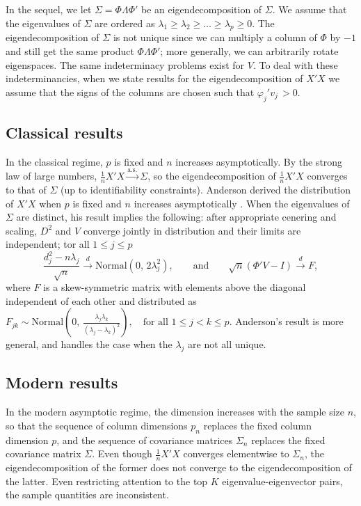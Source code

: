 \documentclass{eoeauth}
\begin{document}
In the sequel, we let $\Sigma = \Phi \Lambda \Phi'$ be an
eigendecomposition of $\Sigma$.  We assume that the eigenvalues of
$\Sigma$ are ordered as $\lambda_1 \geq \lambda_2 \geq \dotsc \geq \lambda_p \geq 0$.
The eigendecomposition of $\Sigma$ is not unique since we can multiply
a column of $\Phi$ by $-1$ and still get the same product $\Phi
\Lambda \Phi'$; more generally, we can arbitrarily rotate
eigenspaces.  The same indeterminacy problems exist for $V$.  To deal
with these indeterminancies, when we state results for the
eigendecomposition of $X' X$ we assume that the signs of the columns
are chosen such that $\varphi_j ' v_j \, > 0$.


\subsection{Classical results}

In the classical regime, $p$ is fixed and $n$ increases
asymptotically.  By the strong law of large numbers, $\tfrac{1}{n} X'
X \overset{\text{a.s.}}{\to} \Sigma$, so the eigendecomposition of
$\tfrac{1}{n} X' X$ converges to that of $\Sigma$ (up to
identifiability constraints).
Anderson derived the distribution of $X' X$ when $p$ is fixed and $n$
increases asymptotically \cite{anderson63}.  When the eigenvalues of $\Sigma$ are
distinct, his result implies the following: after appropriate cenering
and scaling, $D^2$ and $V$ converge jointly in distribution and their limits are independent;
tor all $1 \leq j \leq p$
\[
  \frac{d^2_{j} - n \lambda_j}{\sqrt{n}}
    \overset{d}{\to}
      \mathrm{Normal}\left( 0, \, 2 \lambda_j^2 \right),
\qquad\text{and}\qquad
   \sqrt{n} \left( \Phi' V - I \right) \overset{d}{\to} F,
\]
where $F$ is a skew-symmetric matrix with elements above the 
diagonal independent of each other and distributed as 
\(
  F_{jk}
    \sim
      \mathrm{Normal} \left(
        0, \,
        \frac{\lambda_j \lambda_k}
        {\left( \lambda_j - \lambda_k \right)^2}
      \right),
      \quad
      \text{for all $1 \leq j < k \leq p$.}
\)
Anderson's result is more general, and handles the case when the
$\lambda_j$ are not all unique.


\subsection{Modern results}

In the modern asymptotic regime, the dimension increases with the
sample size $n$, so that the sequence of column dimensions $p_n$
replaces the fixed column dimension $p$, and the sequence of
covariance matrices $\Sigma_n$ replaces the fixed covariance matrix $\Sigma$.
Even though  $\tfrac{1}{n} X' X$ converges elementwise to $\Sigma_n$,
the eigendecomposition of the former does not converge to the
eigendecomposition of the latter.  Even restricting attention to the
top $K$ eigenvalue-eigenvector pairs, the sample quantities are inconsistent.
\end{document}
